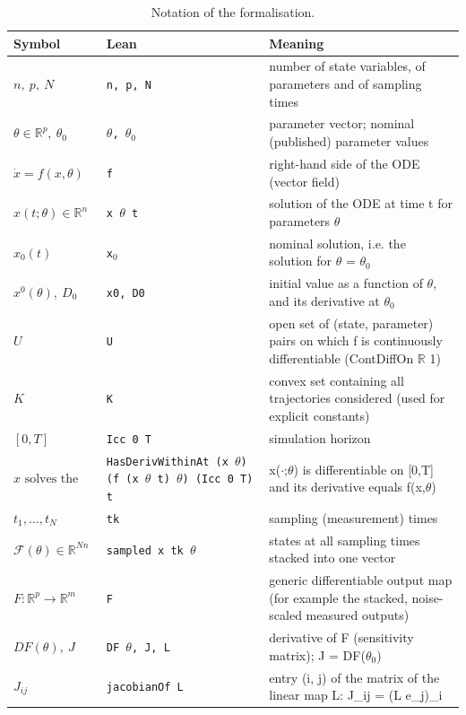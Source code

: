 {\small
\begin{longtable}{@{}>{\raggedright\arraybackslash}p{4.0cm}>{\raggedright\arraybackslash}p{4.6cm}>{\raggedright\arraybackslash}p{7.2cm}@{}}
\caption{Notation of the formalisation.}\label{tab:leannot}\\
\toprule
Symbol & Lean & Meaning \\
\midrule
\endhead
$n,\ p,\ N$ & \texttt{n, p, N} & number of state variables, of parameters and of sampling times \\
$\theta\in\mathbb{R}^p,\ \theta_0$ & \texttt{$\theta$, $\theta_0$} & parameter vector; nominal (published) parameter values \\
$\dot x=f(x,\theta)$ & \texttt{f} & right-hand side of the ODE (vector field) \\
$x(t;\theta)\in\mathbb{R}^n$ & \texttt{x $\theta$ t} & solution of the ODE at time t for parameters $\theta$ \\
$x_0(t)$ & \texttt{x$_0$} & nominal solution, i.e. the solution for $\theta$ = $\theta_0$ \\
$x^0(\theta),\ D_0$ & \texttt{x0, D0} & initial value as a function of $\theta$, and its derivative at $\theta_0$ \\
$U$ & \texttt{U} & open set of (state, parameter) pairs on which f is continuously differentiable (ContDiffOn $\mathbb R$ 1) \\
$K$ & \texttt{K} & convex set containing all trajectories considered (used for explicit constants) \\
$[0,T]$ & \texttt{Icc 0 T} & simulation horizon \\
$x \text{ solves the ODE}$ & \texttt{HasDerivWithinAt (x $\theta$) (f (x $\theta$ t) $\theta$) (Icc 0 T) t} & x($\cdot$;$\theta$) is differentiable on [0,T] and its derivative equals f(x,$\theta$) \\
$t_1,\dots,t_N$ & \texttt{tk} & sampling (measurement) times \\
$\mathcal{F}(\theta)\in\mathbb{R}^{Nn}$ & \texttt{sampled x tk $\theta$} & states at all sampling times stacked into one vector \\
$F:\mathbb{R}^p\to\mathbb{R}^m$ & \texttt{F} & generic differentiable output map (for example the stacked, noise-scaled measured outputs) \\
$DF(\theta),\ J$ & \texttt{DF $\theta$, J, L} & derivative of F (sensitivity matrix); J = DF($\theta_0$) \\
$J_{ij}$ & \texttt{jacobianOf L} & entry (i, j) of the matrix of the linear map L: J\_ij = (L e\_j)\_i \\

\end{longtable}}
